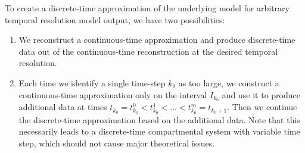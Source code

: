 \documentclass[11pt,a4paper]{article}
\begin{document}
    To  create a discrete-time approximation of the underlying model for arbitrary temporal resolution model output, we have two possibilities:
    \begin{enumerate}[(1)]
        \item We reconstruct a continuous-time approximation and produce discrete-time data out of the continuous-time reconstruction at the desired temporal resolution.
        \item Each time we identify a single time-step $k_0$ as too large, we construct a continuous-time approximation only on the interval $I_{k_0}$ and use it to produce additional data at times $t_{k_0}=t_{k_0}^0<t_{k_0}^1<\ldots<t_{k_0}^m=t_{k_0+1}$.
        Then we continue the discrete-time approximation based on the additional data.
        Note that this necessarily leads to a discrete-time compartmental system with variable time step, which should not cause major theoretical issues.
    \end{enumerate}
\end{document}
